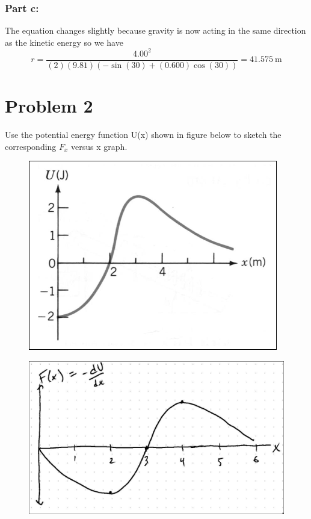 \documentclass{article}
\begin{document}
\subsubsection*{Part c:}
 The equation changes slightly because gravity is now acting in the same direction as the kinetic energy so we have
\[
	r = \frac{4.00^2}{(2)(9.81)\left(-\sin(30) + (0.600)\cos(30)\right)} = \boxed{41.575\ \text{m}}
\]


\section*{Problem 2}
Use the potential energy function U(x) shown in figure below to sketch the corresponding $F_x$ versus x
graph.

\begin{figure}[ht]
    \centering
    \includegraphics[scale=.5]{drawing-1.png}
\end{figure}

\begin{figure}[ht]
    \centering
    \includegraphics[scale=.20]{graph-1.png}
\end{figure}
\end{document}
